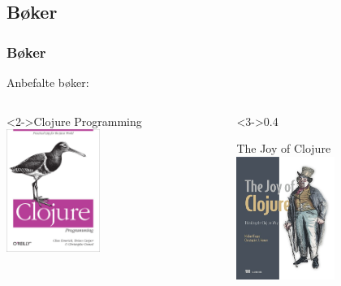 \documentclass{beamer}
\begin{document}
\subsection{Bøker}
\begin{frame}
  \frametitle{Bøker}
  Anbefalte bøker:

\begin{columns}[T]
    \begin{column}{0.4\textwidth}
      \begin{block}<2->{Clojure Programming}
        \centering
        \includegraphics[height=4cm]{img/clj-prog}
      \end{block}
    \end{column}
    \begin{column}<3->{0.4\textwidth}
      \begin{block}{The Joy of Clojure}
        \centering
        \includegraphics[height=4cm]{img/joy-of-clj}
      \end{block}
    \end{column}
  \end{columns}
\vspace{3mm}
\end{frame}
\end{document}
